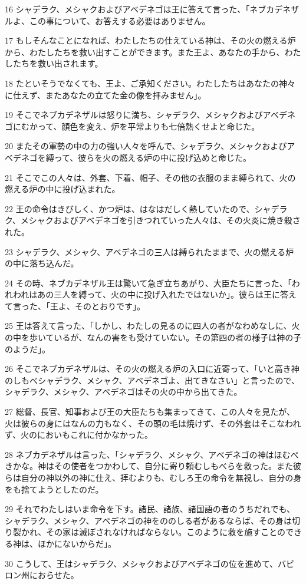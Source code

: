 \par 16 シャデラク、メシャクおよびアベデネゴは王に答えて言った、「ネブカデネザルよ、この事について、お答えする必要はありません。
\par 17 もしそんなことになれば、わたしたちの仕えている神は、その火の燃える炉から、わたしたちを救い出すことができます。また王よ、あなたの手から、わたしたちを救い出されます。
\par 18 たといそうでなくても、王よ、ご承知ください。わたしたちはあなたの神々に仕えず、またあなたの立てた金の像を拝みません」。
\par 19 そこでネブカデネザルは怒りに満ち、シャデラク、メシャクおよびアベデネゴにむかって、顔色を変え、炉を平常よりも七倍熱くせよと命じた。
\par 20 またその軍勢の中の力の強い人々を呼んで、シャデラク、メシャクおよびアベデネゴを縛って、彼らを火の燃える炉の中に投げ込めと命じた。
\par 21 そこでこの人々は、外套、下着、帽子、その他の衣服のまま縛られて、火の燃える炉の中に投げ込まれた。
\par 22 王の命令はきびしく、かつ炉は、はなはだしく熱していたので、シャデラク、メシャクおよびアベデネゴを引きつれていった人々は、その火炎に焼き殺された。
\par 23 シャデラク、メシャク、アベデネゴの三人は縛られたままで、火の燃える炉の中に落ち込んだ。
\par 24 その時、ネブカデネザル王は驚いて急ぎ立ちあがり、大臣たちに言った、「われわれはあの三人を縛って、火の中に投げ入れたではないか」。彼らは王に答えて言った、「王よ、そのとおりです」。
\par 25 王は答えて言った、「しかし、わたしの見るのに四人の者がなわめなしに、火の中を歩いているが、なんの害をも受けていない。その第四の者の様子は神の子のようだ」。
\par 26 そこでネブカデネザルは、その火の燃える炉の入口に近寄って、「いと高き神のしもべシャデラク、メシャク、アベデネゴよ、出てきなさい」と言ったので、シャデラク、メシャク、アベデネゴはその火の中から出てきた。
\par 27 総督、長官、知事および王の大臣たちも集まってきて、この人々を見たが、火は彼らの身にはなんの力もなく、その頭の毛は焼けず、その外套はそこなわれず、火のにおいもこれに付かなかった。
\par 28 ネブカデネザルは言った、「シャデラク、メシャク、アベデネゴの神はほむべきかな。神はその使者をつかわして、自分に寄り頼むしもべらを救った。また彼らは自分の神以外の神に仕え、拝むよりも、むしろ王の命令を無視し、自分の身をも捨てようとしたのだ。
\par 29 それでわたしはいま命令を下す。諸民、諸族、諸国語の者のうちだれでも、シャデラク、メシャク、アベデネゴの神をののしる者があるならば、その身は切り裂かれ、その家は滅ぼされなければならない。このように救を施すことのできる神は、ほかにないからだ」。
\par 30 こうして、王はシャデラク、メシャクおよびアベデネゴの位を進めて、バビロン州におらせた。

